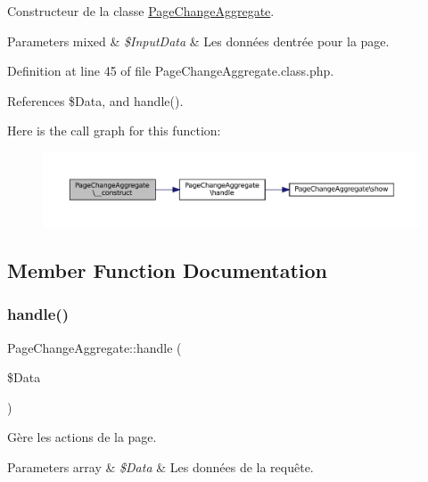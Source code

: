 Constructeur de la classe \hyperlink{class_page_change_aggregate}{Page\+Change\+Aggregate}.


\begin{DoxyParams}[1]{Parameters}
mixed & {\em \$\+Input\+Data} & Les données d\textquotesingle{}entrée pour la page. \\
\hline
\end{DoxyParams}


Definition at line 45 of file Page\+Change\+Aggregate.\+class.\+php.



References \$\+Data, and handle().

Here is the call graph for this function\+:\nopagebreak
\begin{figure}[H]
\begin{center}
\leavevmode
\includegraphics[width=350pt]{class_page_change_aggregate_a37b7538f25666dae026a11df00733b32_cgraph}
\end{center}
\end{figure}


\subsection{Member Function Documentation}
\mbox{\label{class_page_change_aggregate_a9aa7ddde1d298c61ecca29c42f99a4c7}} 
\subsubsection{\texorpdfstring{handle()}{handle()}}
{\footnotesize\ttfamily Page\+Change\+Aggregate\+::handle (\begin{DoxyParamCaption}\item[{}]{\$\+Data }\end{DoxyParamCaption})\hspace{0.3cm}{\ttfamily [protected]}}

Gère les actions de la page.


\begin{DoxyParams}[1]{Parameters}
array & {\em \$\+Data} & Les données de la requête. \\
\hline
\end{DoxyParams}


